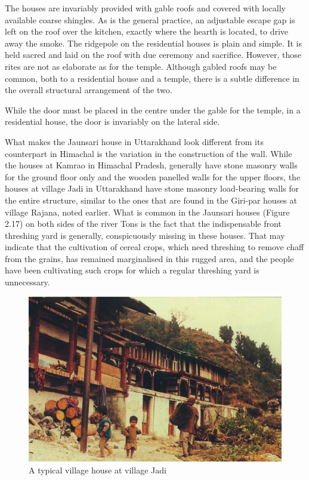 The houses are invariably provided with gable roofs and covered with locally available coarse shingles. As is the general practice, an adjustable escape gap is left on the roof over the kitchen, exactly where the hearth is located, to drive away the smoke. The ridgepole on the residential houses is plain and simple. It is held sacred and laid on the roof with due ceremony and sacrifice. However, those rites are not as elaborate as for the temple. Although gabled roofs may be common, both to a residential house and a temple, there is a subtle difference in the overall structural arrangement of the two.

While the door must be placed in the centre under the gable for the temple, in a residential house, the door is invariably on the lateral side.

What makes the Jaunsari house in Uttarakhand look different from its counterpart in Himachal is the variation in the construction of the wall. While the houses at Kamrao in Himachal Pradesh, generally have stone masonry walls for the ground floor only and the wooden panelled walls for the upper floors, the houses at village Jadi in Uttarakhand have stone masonry load-bearing walls for the entire structure, similar to the ones that are found in the Giri-par houses at village Rajana, noted earlier. What is common in the Jaunsari houses (Figure 2.17) on both sides of the river Tons is the fact that the indispensable front threshing yard is generally, conspicuously missing in these houses. That may indicate that the cultivation of cereal crops, which need threshing to remove chaff from the grains, has remained marginalised in this rugged area, and the people have been cultivating such crops for which a regular threshing yard is unnecessary.

\begin{figure}[!htbp]
\includegraphics[scale=.37]{images/chap02-17.jpg}
\caption{A typical village house at village Jadi}\label{chap02-fig17}
\end{figure}


